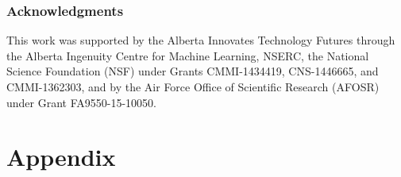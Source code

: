 \documentclass{article}
\begin{document}


\subsubsection*{Acknowledgments}
This work was supported by the Alberta Innovates Technology Futures through the Alberta Ingenuity Centre for Machine Learning, NSERC, the National Science Foundation (NSF) under Grants CMMI-1434419, CNS-1446665, and CMMI-1362303, and by the Air Force Office of Scientific Research (AFOSR) under Grant FA9550-15-10050.

\clearpage
\newpage




\clearpage
\newpage
\onecolumn
 \section*{Appendix}


\end{document}
